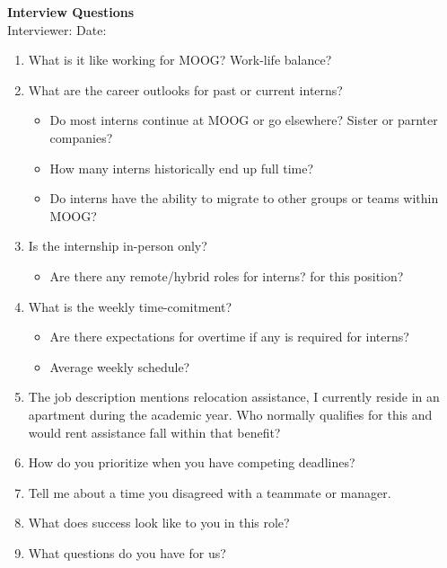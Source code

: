 \documentclass[11pt, letterpaper]{article}
\begin{document}
\begin{center}
	{\large\textbf{Interview Questions}}\\[0.5em]
	Interviewer: \underline{\hspace{5cm}} \quad Date: \underline{\hspace{3cm}}
\end{center}

\vspace{2em}

\begin{enumerate}[leftmargin=*, itemsep=3.5em, label=\arabic*.]

	\item What is it like working for MOOG? Work-life balance?

	\item What are the career outlooks for past or current interns?
	      \begin{itemize}[leftmargin=*, itemsep=1.5em]
		      \item Do most interns continue at MOOG or go elsewhere? Sister or parnter companies?
		      \item How many interns historically end up full time?
		      \item Do interns have the ability to migrate to other groups or teams within MOOG?
	      \end{itemize}

	\item Is the internship in-person only?
	      \begin{itemize}[leftmargin=*, itemsep=1.5em]
		      \item Are there any remote/hybrid roles for interns? for this position?
	      \end{itemize}
	\item What is the weekly time-comitment?
	      \begin{itemize}
		      \item Are there expectations for overtime if any is required for interns?
		      \item Average weekly schedule?
	      \end{itemize}
	\item 		      The job description mentions relocation assistance, I currently reside in an apartment during the academic year. Who normally qualifies for this and would rent assistance fall within that benefit?

	\item How do you prioritize when you have competing deadlines?

	\item Tell me about a time you disagreed with a teammate or manager.

	\item What does success look like to you in this role?

	\item What questions do you have for us?

\end{enumerate}
\end{document}
